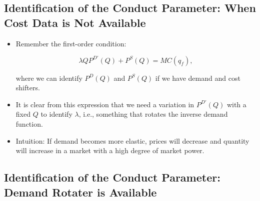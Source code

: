 \documentclass[]{book}
\providecommand{\tightlist}{%
  \setlength{\itemsep}{0pt}\setlength{\parskip}{0pt}}
\begin{document}
\subsection{Identification of the Conduct Parameter: When Cost Data is
Not
Available}\label{identification-of-the-conduct-parameter-when-cost-data-is-not-available}

\begin{itemize}
\tightlist
\item
  Remember the first-order condition:

  \begin{equation}
  \lambda Q P^{D\prime}(Q) + P^S(Q) = MC(q_f),
  \end{equation}

  where we can identify \(P^D(Q)\) and \(P^S(Q)\) if we have demand and
  cost shifters.
\item
  It is clear from this expression that we need a variation in
  \(P^{D\prime}(Q)\) with a fixed \(Q\) to identify \(\lambda\), i.e.,
  something that rotates the inverse demand function.
\item
  Intuition: If demand becomes more elastic, prices will decrease and
  quantity will increase in a market with a high degree of market power.
\end{itemize}

\subsection{Identification of the Conduct Parameter: Demand Rotater is
Available}\label{identification-of-the-conduct-parameter-demand-rotater-is-available}
\end{document}
